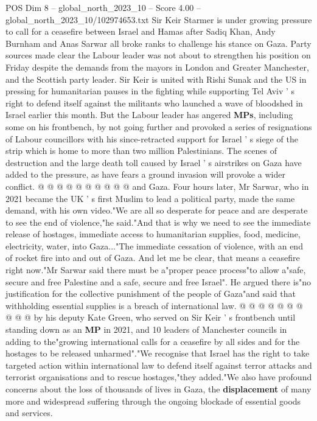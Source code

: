 \begin{textsample}{POS Dim 8 – global\_north\_2023\_10 – Score 4.00 – global\_north\_2023\_10/102974653.txt}  \label{ex:f8_pos_210}
Sir Keir Starmer is under growing pressure to call for a ceasefire between Israel and Hamas after Sadiq Khan, Andy Burnham and Anas Sarwar all broke ranks to challenge his stance on Gaza.
Party sources made clear the Labour leader was not about to strengthen his position on Friday despite the demands from the mayors in London and Greater Manchester, and the Scottish party leader.
Sir Keir is united with Rishi Sunak and the US in pressing for humanitarian pauses in the fighting while supporting Tel Aviv ' s right to defend itself against the militants who launched a wave of bloodshed in Israel earlier this month.
But the Labour leader has angered \textbf{MPs}, including some on his frontbench, by not going further and provoked a series of resignations of Labour councillors with his since-retracted support for Israel ' s siege of the strip which is home to more than two million Palestinians.
The scenes of destruction and the large death toll caused by Israel ' s airstrikes on Gaza have added to the pressure, as have fears a ground invasion will provoke a wider conflict. @ @ @ @ @ @ @ @ @ @ and Gaza.
Four hours later, Mr Sarwar, who in 2021 became the UK ' s first Muslim to lead a political party, made the same demand, with his own video."We are all so desperate for peace and are desperate to see the end of violence,"he said."And that is why we need to see the immediate release of hostages, immediate access to humanitarian supplies, food, medicine, electricity, water, into Gaza..."The immediate cessation of violence, with an end of rocket fire into and out of Gaza.
And let me be clear, that means a ceasefire right now."Mr Sarwar said there must be a"proper peace process"to allow a"safe, secure and free Palestine and a safe, secure and free Israel".
He argued there is"no justification for the collective punishment of the people of Gaza"and said that withholding essential supplies is a breach of international law. @ @ @ @ @ @ @ @ @ @ by his deputy Kate Green, who served on Sir Keir ' s frontbench until standing down as an \textbf{MP} in 2021, and 10 leaders of Manchester councils in adding to the"growing international calls for a ceasefire by all sides and for the hostages to be released unharmed"."We recognise that Israel has the right to take targeted action within international law to defend itself against terror attacks and terrorist organisations and to rescue hostages,"they added."We also have profound concerns about the loss of thousands of lives in Gaza, the \textbf{displacement} of many more and widespread suffering through the ongoing blockade of essential goods and services.

\end{textsample}
